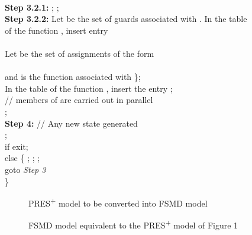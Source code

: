 \documentclass[9pt,executive]{article}
\def\presp{PRES\textsuperscript{+}}
\def\fsmd{FSMD}
\def\presp{PRES\textsuperscript{+}}
\def\fsmd{FSMD}
\begin{document}
\hspace*{0.25in}{\bf Step 3.2:} \\ 
\hspace*{0.35in} {\bf Step 3.2.1:} ; ;\\             
\hspace*{0.35in} {\bf Step 3.2.2:} Let  be the set of guards associated with . In the table\\
\hspace*{1.04in} of the function , insert entry\\
\hspace*{1.04in} \\
\hspace*{0.35in}{\bf Step 3.2.3:} Let  be the set of assignments of the form\\
\hspace*{1.06in}\\
\hspace*{2.36in} and  is the function associated with  \}; \\
\hspace*{1.06in} In the table of the function , insert the entry ;\\ 
\hspace*{1.06in} // members of  are carried out in parallel\\ 
\hspace*{0.35in}{\bf Step 3.2.4:} ; \\        
{\bf Step 4:} // Any new state generated \\
\hspace*{0.42in}   ;\\
\hspace*{0.42in} if   exit;\\
\hspace*{0.48in} else \{ ; ; ;\\
\hspace*{0.83in} goto {\it Step 3}\\
\hspace*{0.75in} \}\\

\begin{figure}[htbp]
\centerline{}
\caption{{\presp} model to be converted into {\fsmd} model}
\end{figure}
            
\begin{figure}[htbp]
\centerline{}
\caption{{\fsmd} model equivalent to the {\presp} model of Figure 1}

\end{figure}
 
\end{document}
